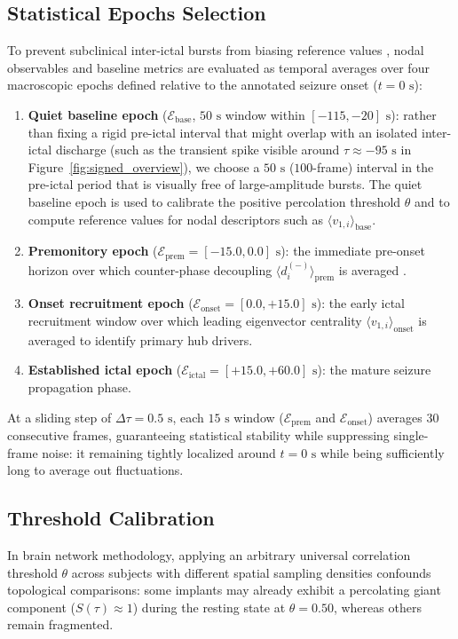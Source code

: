 \subsection{Statistical Epochs Selection}
\label{subsec:statistical_epochs}
To prevent subclinical inter-ictal bursts from biasing reference values \cite{mormann2007seizure}, nodal observables and baseline metrics are evaluated as temporal averages over four macroscopic epochs defined relative to the annotated seizure onset ($t = 0\text{ s}$):
\begin{enumerate}
    \item \textbf{Quiet baseline epoch} ($\mathcal{E}_{\text{base}}$, $50\text{ s}$ window within $[-115, -20]\text{ s}$): rather than fixing a rigid pre-ictal interval that might overlap with an isolated inter-ictal discharge (such as the transient spike visible around $\tau \approx -95\text{ s}$ in Figure~\ref{fig:signed_overview}), we choose a $50\text{ s}$ ($100$-frame) interval in the pre-ictal period that is visually free of large-amplitude bursts. The quiet baseline epoch is used to calibrate the positive percolation threshold $\theta$ and to compute reference values for nodal descriptors such as $\langle v_{1,i} \rangle_{\text{base}}$.
    \item \textbf{Premonitory epoch} ($\mathcal{E}_{\text{prem}} = [-15.0, 0.0]\text{ s}$): the immediate pre-onset horizon over which counter-phase decoupling $\langle d_i^{(-)} \rangle_{\text{prem}}$ is averaged \cite{mormann2003epileptic, jiruska2013synchronization}.
    \item \textbf{Onset recruitment epoch} ($\mathcal{E}_{\text{onset}} = [0.0, +15.0]\text{ s}$): the early ictal recruitment window over which leading eigenvector centrality $\langle v_{1,i} \rangle_{\text{onset}}$ is averaged to identify primary hub drivers.
    \item \textbf{Established ictal epoch} ($\mathcal{E}_{\text{ictal}} = [+15.0, +60.0]\text{ s}$): the mature seizure propagation phase.
\end{enumerate}
At a sliding step of $\Delta \tau = 0.5\text{ s}$, each $15\text{ s}$ window ($\mathcal{E}_{\text{prem}}$ and $\mathcal{E}_{\text{onset}}$) averages $30$ consecutive frames, guaranteeing statistical stability while suppressing single-frame noise: it remaining tightly localized around $t = 0\text{ s}$ while being sufficiently long to average out fluctuations.

\subsection{Threshold Calibration}
\label{subsec:threshold_calibration}
In brain network methodology, applying an arbitrary universal correlation threshold $\theta$ across subjects with different spatial sampling densities confounds topological comparisons: some implants may already exhibit a percolating giant component ($S(\tau) \approx 1$) during the resting state at $\theta = 0.50$, whereas others remain fragmented.

